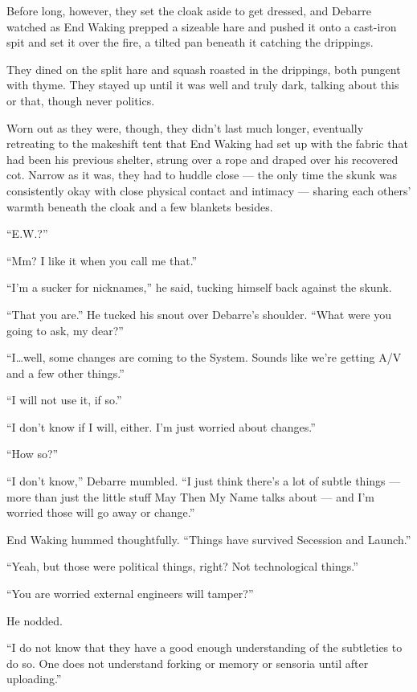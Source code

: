 Before long, however, they set the cloak aside to get dressed, and Debarre watched as End Waking prepped a sizeable hare and pushed it onto a cast-iron spit and set it over the fire, a tilted pan beneath it catching the drippings.

They dined on the split hare and squash roasted in the drippings, both pungent with thyme. They stayed up until it was well and truly dark, talking about this or that, though never politics.

Worn out as they were, though, they didn't last much longer, eventually retreating to the makeshift tent that End Waking had set up with the fabric that had been his previous shelter, strung over a rope and draped over his recovered cot. Narrow as it was, they had to huddle close — the only time the skunk was consistently okay with close physical contact and intimacy — sharing each others' warmth beneath the cloak and a few blankets besides.

``E.W.?''

``Mm? I like it when you call me that.''

``I'm a sucker for nicknames,'' he said, tucking himself back against the skunk.

``That you are.'' He tucked his snout over Debarre's shoulder. ``What were you going to ask, my dear?''

``I\ldots well, some changes are coming to the System. Sounds like we're getting A/V and a few other things.''

``I will not use it, if so.''

``I don't know if I will, either. I'm just worried about changes.''

``How so?''

``I don't know,'' Debarre mumbled. ``I just think there's a lot of subtle things — more than just the little stuff May Then My Name talks about — and I'm worried those will go away or change.''

End Waking hummed thoughtfully. ``Things have survived Secession and Launch.''

``Yeah, but those were political things, right? Not technological things.''

``You are worried external engineers will tamper?''

He nodded.

``I do not know that they have a good enough understanding of the subtleties to do so. One does not understand forking or memory or sensoria until after uploading.''

